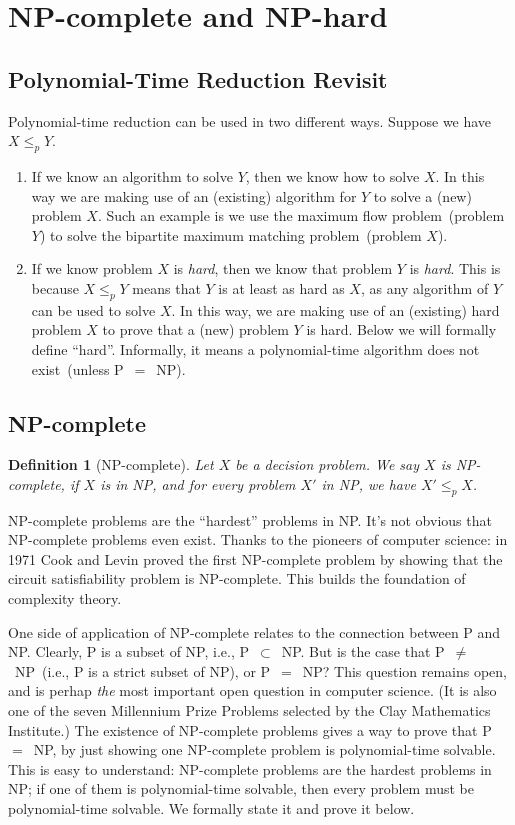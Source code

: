 \documentclass[letterpaper,11pt]{article}
\theoremstyle{mytheorem}
\newtheorem{definition}{Definition}
\begin{document}
\section*{NP-complete and NP-hard}

\subsection*{Polynomial-Time Reduction Revisit}

Polynomial-time reduction can be used in two different ways. Suppose we have $X\le_p Y$.
\vspace*{-\topsep}
\begin{enumerate}
\item If we know an algorithm to solve $Y$, then we know how to solve $X$. In this way
we are making use of an (existing) algorithm for $Y$ to solve a (new) problem $X$. Such an example
is we use the maximum flow problem~(problem $Y$) to solve the bipartite maximum matching problem~(problem $X$).
\item If we know problem $X$ is \emph{hard}, then we know that problem $Y$ is \emph{hard}. 
This is because $X\le_p Y$ means that $Y$ is at least as hard as $X$, as any algorithm of $Y$ can be used to solve $X$.
In this way, we are making use of an (existing) hard problem $X$
to prove that a (new) problem $Y$ is hard.  Below we will formally define ``hard''.
Informally, it means a polynomial-time algorithm does not exist~(unless P{}~$=${}~NP).
\end{enumerate}


\subsection*{NP-complete}

\begin{definition}[NP-complete]
Let $X$ be a decision problem. We say $X$ is NP-complete, if $X$ is in NP, and for every problem $X'$ in NP, we have $X'\le_p X$.
\end{definition}

NP-complete problems are the ``hardest'' problems in NP. It's not obvious that
NP-complete problems even exist.  
Thanks to the pioneers of computer science: in 1971 Cook and Levin proved the first
NP-complete problem by showing that the circuit satisfiability problem is NP-complete.
This builds the foundation of complexity theory.

One side of application of NP-complete relates to the connection between P and NP.
Clearly, P is a subset of NP, i.e., P{}~$\subset${}~NP.
But is the case that P{}~$\neq${}~NP~(i.e., P is a strict subset of NP),
or P{}~$=${}~NP?  This question remains open,
and is perhap \emph{the} most important open question in computer science.
(It is also one of the seven Millennium Prize Problems selected by the Clay Mathematics Institute.)
The existence of NP-complete problems gives a way to prove that P{}~$=${}~NP, by just showing
one NP-complete problem is polynomial-time solvable. This is easy to understand: NP-complete
problems are the hardest problems in NP; if one of them is polynomial-time solvable,
then every problem must be polynomial-time solvable. We formally state it and prove it below.
\end{document}
